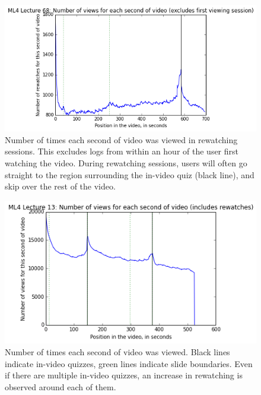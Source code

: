 \documentclass[letterpaper]{article}
\begin{document}
\begin{figure}
\includegraphics[width=1.0\columnwidth]{rewatchingsessions}
\caption{Number of times each second of video was viewed in rewatching sessions. This excludes logs from within an hour of the user first watching the video. During rewatching sessions, users will often go straight to the region surrounding the in-video quiz (black line), and skip over the rest of the video.}
\label{fig:rewatchingsessions}
\end{figure}

\begin{figure}
\includegraphics[width=1.0\columnwidth]{watched13}
\caption{Number of times each second of video was viewed. Black lines indicate in-video quizzes, green lines indicate slide boundaries. Even if there are multiple in-video quizzes, an increase in rewatching is observed around each of them.}
\label{fig:watched13}
\end{figure}
\end{document}
